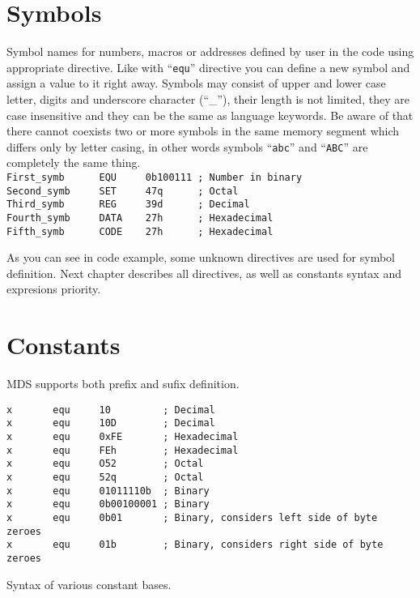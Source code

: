\section{Symbols}
    Symbol names for numbers, macros or addresses defined by user in the code using appropriate directive. Like with ``\texttt{equ}'' directive you can define a new symbol and assign a value to it right away. Symbols may consist of upper and lower case letter, digits and underscore character (``\_''), their length is not limited, they are case insensitive and they can be the same as language keywords. Be aware of that there cannot coexists two or more symbols in the same memory segment which differs only by letter casing, in other words symbols ``\texttt{abc}'' and ``\texttt{ABC}'' are completely the same thing.
    {
        ~\\
        \usecodefont
        \verb'First_symb      EQU     0b100111 ; Number in binary'\\
        \verb'Second_symb     SET     47q      ; Octal'\\
        \verb'Third_symb      REG     39d      ; Decimal'\\
        \verb'Fourth_symb     DATA    27h      ; Hexadecimal'\\
        \verb'Fifth_symb      CODE    27h      ; Hexadecimal'
    }

    As you can see in code example, some unknown directives are used for symbol definition. Next chapter describes all directives, as well as constants syntax and expresions priority.

\section{Constants}
    MDS supports both prefix and sufix definition.

    \begin{code}[h!]
    {
        \usecodefont

        \verb'x       equ     10         ; Decimal'\\
        \verb'x       equ     10D        ; Decimal'\\
        \verb'x       equ     0xFE       ; Hexadecimal'\\
        \verb'x       equ     FEh        ; Hexadecimal'\\
        \verb'x       equ     O52        ; Octal'\\
        \verb'x       equ     52q        ; Octal'\\
        \verb'x       equ     01011110b  ; Binary'\\
        \verb'x       equ     0b00100001 ; Binary'\\
        \verb'x       equ     0b01       ; Binary, considers left side of byte zeroes'\\
        \verb'x       equ     01b        ; Binary, considers right side of byte zeroes'

        \caption{Syntax of various constant bases.}
        \label{code:svcb}
    }
    \end{code}


